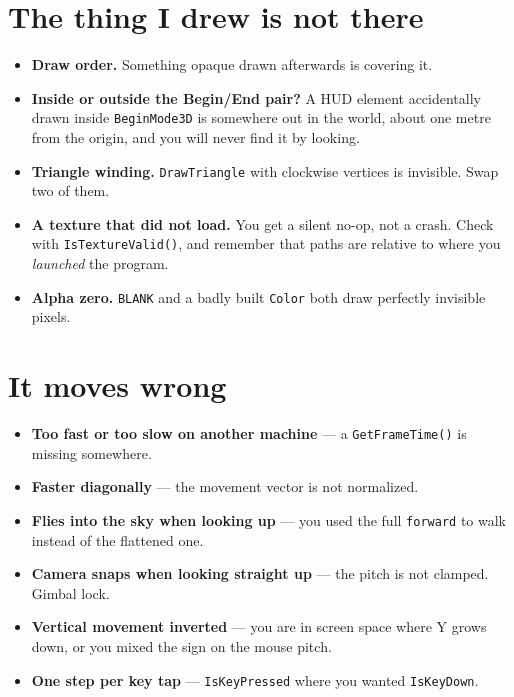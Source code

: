 \section{The thing I drew is not there}

\begin{itemize}[leftmargin=*,itemsep=3pt]
  \item \textbf{Draw order.} Something opaque drawn afterwards is covering it.
  \item \textbf{Inside or outside the Begin/End pair?} A HUD element accidentally
        drawn inside \lstinline|BeginMode3D| is somewhere out in the world,
        about one metre from the origin, and you will never find it by looking.
  \item \textbf{Triangle winding.} \lstinline|DrawTriangle| with clockwise
        vertices is invisible. Swap two of them.
  \item \textbf{A texture that did not load.} You get a silent no-op, not a
        crash. Check with \lstinline|IsTextureValid()|, and remember that paths
        are relative to where you \emph{launched} the program.
  \item \textbf{Alpha zero.} \lstinline|BLANK| and a badly built
        \lstinline|Color| both draw perfectly invisible pixels.
\end{itemize}

\section{It moves wrong}

\begin{itemize}[leftmargin=*,itemsep=3pt]
  \item \textbf{Too fast or too slow on another machine} --- a
        \lstinline|GetFrameTime()| is missing somewhere.
  \item \textbf{Faster diagonally} --- the movement vector is not normalized.
  \item \textbf{Flies into the sky when looking up} --- you used the full
        \lstinline|forward| to walk instead of the flattened one.
  \item \textbf{Camera snaps when looking straight up} --- the pitch is not
        clamped. Gimbal lock.
  \item \textbf{Vertical movement inverted} --- you are in screen space where Y
        grows down, or you mixed the sign on the mouse pitch.
  \item \textbf{One step per key tap} --- \lstinline|IsKeyPressed| where you
        wanted \lstinline|IsKeyDown|.
\end{itemize}

